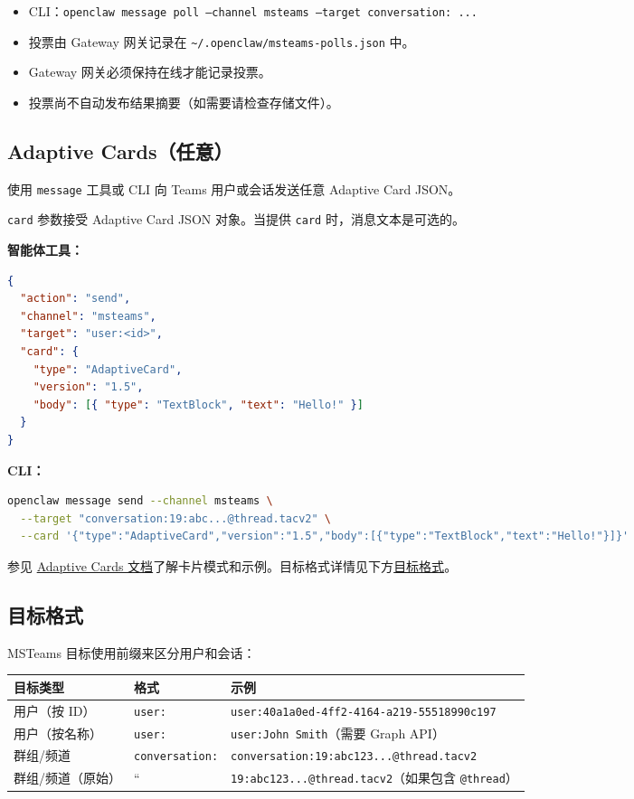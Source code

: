 \begin{itemize}
  \item CLI：\texttt{openclaw message poll --channel msteams --target conversation: ...}
  \item 投票由 Gateway 网关记录在 \texttt{\textasciitilde{}/.openclaw/msteams-polls.json} 中。
  \item Gateway 网关必须保持在线才能记录投票。
  \item 投票尚不自动发布结果摘要（如需要请检查存储文件）。
\end{itemize}


\subsection{Adaptive Cards（任意）}


使用 \texttt{message} 工具或 CLI 向 Teams 用户或会话发送任意 Adaptive Card JSON。

\texttt{card} 参数接受 Adaptive Card JSON 对象。当提供 \texttt{card} 时，消息文本是可选的。

\textbf{智能体工具：}

\begin{lstlisting}[language=json]
{
  "action": "send",
  "channel": "msteams",
  "target": "user:<id>",
  "card": {
    "type": "AdaptiveCard",
    "version": "1.5",
    "body": [{ "type": "TextBlock", "text": "Hello!" }]
  }
}
\end{lstlisting}


\textbf{CLI：}

\begin{lstlisting}[language=bash]
openclaw message send --channel msteams \
  --target "conversation:19:abc...@thread.tacv2" \
  --card '{"type":"AdaptiveCard","version":"1.5","body":[{"type":"TextBlock","text":"Hello!"}]}'
\end{lstlisting}


参见 \href{https://adaptivecards.io/}{Adaptive Cards 文档}了解卡片模式和示例。目标格式详情见下方\href{\#target-formats}{目标格式}。

\subsection{目标格式}


MSTeams 目标使用前缀来区分用户和会话：


\begin{table}[h]
\centering
\small
\begin{tabular}{|l|l|l|}
\hline
目标类型 & 格式 & 示例 \\
\hline
用户（按 ID） & \texttt{user:} & \texttt{user:40a1a0ed-4ff2-4164-a219-55518990c197} \\
\hline
用户（按名称） & \texttt{user:} & \texttt{user:John Smith}（需要 Graph API） \\
\hline
群组/频道 & \texttt{conversation:} & \texttt{conversation:19:abc123...@thread.tacv2} \\
\hline
群组/频道（原始） & `` & \texttt{19:abc123...@thread.tacv2}（如果包含 \texttt{@thread}） \\
\hline
\end{tabular}
\end{table}



